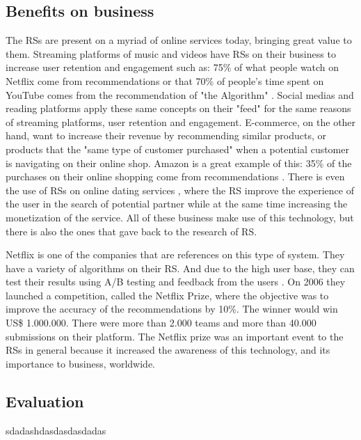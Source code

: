 \subsection{Benefits on business}

The RSs are present on a myriad of online services today, bringing great value to them. Streaming platforms of music and videos have RSs on their business to increase user retention and engagement such as: 75\% of what people watch on Netflix come from recommendations \cite{HowretailerscankeepupwithconsumersMcKinsey} or that 70\% of people's time spent on YouTube comes from the recommendation of "the Algorithm" \cite{CES2018YouTubesAIrecommendationsdrive70percentofviewingCNET}. Social medias and reading platforms apply these same concepts on their "feed" for the same reasons of streaming platforms, user retention and engagement. E-commerce, on the other hand, want to increase their revenue by recommending similar products, or products that the "same type of customer purchased" when a potential customer is navigating on their online shop. Amazon is a great example of this: 35\% of the purchases on their online shopping come from recommendations \cite{HowretailerscankeepupwithconsumersMcKinsey}. There is even the use of RSs on online dating services \cite{brozovsky2007recommender}, where the RS improve the experience of the user in the search of potential partner while at the same time increasing the monetization of the service. All of these business make use of this technology, but there is also the ones that gave back to the research of RS.

Netflix  is one of the companies that are references on this type of system. They have a variety of algorithms on their RS. And due to the high user base, they can test their results using A/B testing and feedback from the users \cite{gomez2016netflix}. On 2006 they launched a competition, called the Netflix Prize, where the objective was to improve the accuracy of the recommendations by 10\%. The winner would win US\$ 1.000.000. There were more than 2.000 teams and more than 40.000 submissions on their platform. The Netflix prize was an important event to the RSs in general because it increased the awareness of this technology, and its importance to business, worldwide. 

\subsection{Evaluation}

sdadashdasdasdasdadas


